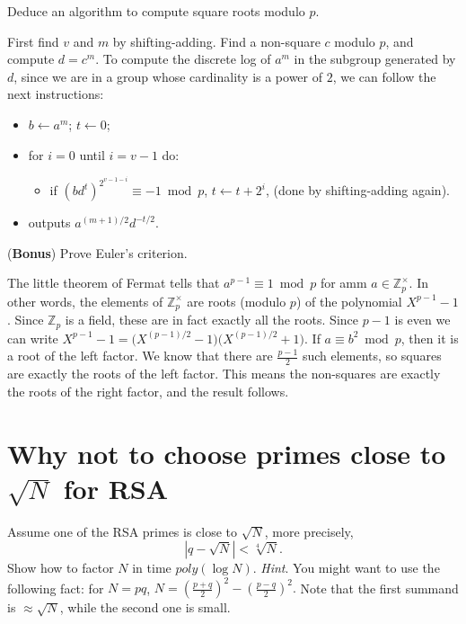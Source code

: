 \documentclass[11pt]{exam}
\theoremstyle{definition}
\begin{document}
{\begin{questions}
  \question Deduce an algorithm to compute square roots modulo $p$.

  \begin{solution}
    First find $v$ and $m$ by shifting-adding. Find a non-square $c$ modulo $p$, and compute $d=c^m$. To compute the discrete log of $a^m$ in the subgroup generated by $d$, since we are in a group whose cardinality is a power of $2$, we can follow the next instructions:
    \begin{itemize}
    \item $b\gets a^m$; $t\gets 0$;
    \item for $i=0$ until $i=v-1$ do:
      \begin{itemize}
      \item if $(bd^t)^{2^{v-1-i}} \equiv -1 \bmod p$, $t\gets t+2^i$,  (done by shifting-adding again).
      \end{itemize}
    \item outputs $a^{(m+1)/2}d^{-t/2}$.
    \end{itemize}

  \end{solution}

  \question (\textbf{Bonus}) Prove Euler's criterion.
  \begin{solution}
    The little theorem of Fermat tells that $a^{p-1}\equiv 1 \bmod p$ for amm $a \in \mathbb{Z}_p^\times$. In other words, the elements of $\mathbb{Z}_p^\times$ are roots (modulo $p$) of the polynomial $X^{p-1}-1$. Since $\mathbb{Z}_p$ is a field, these are in fact exactly all the roots. Since $p-1$ is even we can write $X^{p-1}-1 = \big(X^{(p-1)/2}-1\big)\big(X^{(p-1)/2}+1\big)$. If $a\equiv b^2 \bmod p$, then it is a root of the left factor. We know that there are $\frac{p-1}{2}$ such elements, so squares are exactly the roots of the left factor. This means the non-squares are exactly the roots of the right factor, and the result follows.
    
  \end{solution}
  
\end{questions}
\section{Why not to choose primes close to $\sqrt{N}$ for RSA}
 
Assume one of the RSA primes is close to $\sqrt{N}$, more precisely,
\[ 
	|q - \sqrt{N}| < \sqrt[4]{N}.
\] 
Show how to factor $N$ in time $poly(\log N)$.
\emph{Hint}. You might want to use the following fact: for $N = pq$, $N =
\left( \frac{p+q}{2}\right)^2 - \left( \frac{p-q}{2}\right)^2.
$ Note that
the first summand is $\approx \sqrt{N}$, while the second one is small.

}
\end{document}
